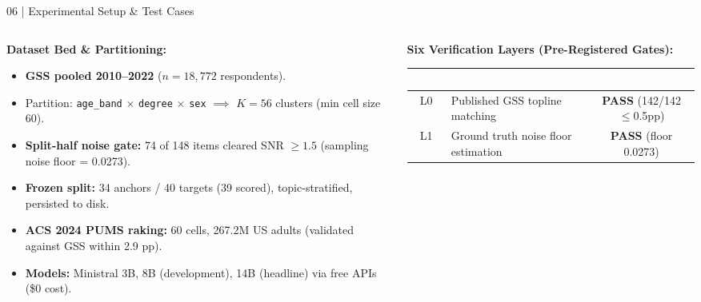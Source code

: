 \documentclass[10pt,aspectratio=169]{beamer}
\begin{document}
\begin{frame}{06 | Experimental Setup \& Test Cases}
    \scriptsize
    \begin{columns}[T]
        \begin{column}{0.48\textwidth}
            \textbf{Dataset Bed \& Partitioning:}
            \begin{itemize}\itemsep3pt
                \item \textbf{GSS pooled 2010--2022} ($n = 18{,}772$ respondents).
                \item Partition: \texttt{age\_band} $\times$ \texttt{degree} $\times$ \texttt{sex} $\implies$ \textbf{$K=56$} clusters (min cell size 60).
                \item \textbf{Split-half noise gate:} 74 of 148 items cleared SNR $\ge 1.5$ (sampling noise floor = 0.0273).
                \item \textbf{Frozen split:} 34 anchors / 40 targets (39 scored), topic-stratified, persisted to disk.
                \item \textbf{ACS 2024 PUMS raking:} 60 cells, 267.2M US adults (validated against GSS within 2.9 pp).
                \item \textbf{Models:} Ministral 3B, 8B (development), 14B (headline) via free APIs (\$0 cost).
            \end{itemize}
        \end{column}
        \begin{column}{0.52\textwidth}
            \textbf{Six Verification Layers (Pre-Registered Gates):}
            \renewcommand{\arraystretch}{1.15}
            \begin{table}
            \begin{tabularx}{\textwidth}{@{} c >{\raggedright\arraybackslash}X c @{}}
                \toprule
                \rowcolor{HeaderNavy} \textcolor{white}{\textbf{Gate}} & \textcolor{white}{\textbf{Verification Check}} & \textcolor{white}{\textbf{Result}} \\
                \midrule
                \rowcolor{RowAlt} L0 & Published GSS topline matching & {\color{TLGreen}\textbf{PASS}} (142/142 $\le$0.5pp) \\
                L1 & Ground truth noise floor estimation & {\color{TLGreen}\textbf{PASS}} (floor 0.0273) \\

\end{tabularx}
\end{table}
\end{column}
\end{columns}
\end{frame}
\end{document}
